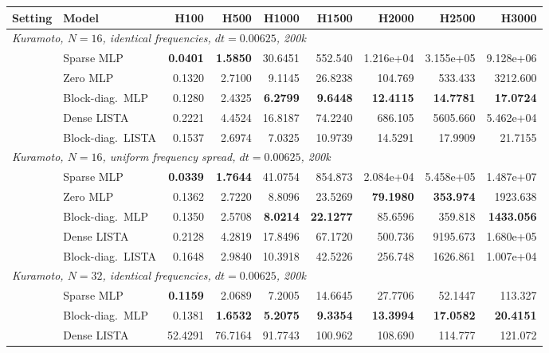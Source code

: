 \begin{table}[ht]
\centering
\scriptsize
\setlength{\tabcolsep}{3.5pt}
\begin{tabular}{p{}p{}rrrrrrr}
\toprule
Setting & Model & H100 & H500 & H1000 & H1500 & H2000 & H2500 & H3000 \\
\midrule
\multicolumn{9}{l}{\textit{Kuramoto, $N=16$, identical frequencies, $dt=0.00625$, 200k}} \\
& Sparse MLP & \textbf{0.0401} & \textbf{1.5850} & 30.6451 & 552.540 & 1.216e+04 & 3.155e+05 & 9.128e+06 \\
& Zero MLP & 0.1320 & 2.7100 & 9.1145 & 26.8238 & 104.769 & 533.433 & 3212.600 \\
& Block-diag.\ MLP & 0.1280 & 2.4325 & \textbf{6.2799} & \textbf{9.6448} & \textbf{12.4115} & \textbf{14.7781} & \textbf{17.0724} \\
& Dense LISTA & 0.2221 & 4.4524 & 16.8187 & 74.2240 & 686.105 & 5605.660 & 5.462e+04 \\
& Block-diag.\ LISTA & 0.1537 & 2.6974 & 7.0325 & 10.9739 & 14.5291 & 17.9909 & 21.7155 \\
\midrule
\multicolumn{9}{l}{\textit{Kuramoto, $N=16$, uniform frequency spread, $dt=0.00625$, 200k}} \\
& Sparse MLP & \textbf{0.0339} & \textbf{1.7644} & 41.0754 & 854.873 & 2.084e+04 & 5.458e+05 & 1.487e+07 \\
& Zero MLP & 0.1362 & 2.7220 & 8.8096 & 23.5269 & \textbf{79.1980} & \textbf{353.974} & 1923.638 \\
& Block-diag.\ MLP & 0.1350 & 2.5708 & \textbf{8.0214} & \textbf{22.1277} & 85.6596 & 359.818 & \textbf{1433.056} \\
& Dense LISTA & 0.2128 & 4.2819 & 17.8496 & 67.1720 & 500.736 & 9195.673 & 1.680e+05 \\
& Block-diag.\ LISTA & 0.1648 & 2.9840 & 10.3918 & 42.5226 & 256.748 & 1626.861 & 1.007e+04 \\
\midrule
\multicolumn{9}{l}{\textit{Kuramoto, $N=32$, identical frequencies, $dt=0.00625$, 200k}} \\
& Sparse MLP & \textbf{0.1159} & 2.0689 & 7.2005 & 14.6645 & 27.7706 & 52.1447 & 113.327 \\
& Block-diag.\ MLP & 0.1381 & \textbf{1.6532} & \textbf{5.2075} & \textbf{9.3354} & \textbf{13.3994} & \textbf{17.0582} & \textbf{20.4151} \\
& Dense LISTA & 52.4291 & 76.7164 & 91.7743 & 100.962 & 108.690 & 114.777 & 121.072 \\

\end{tabular}
\end{table}
